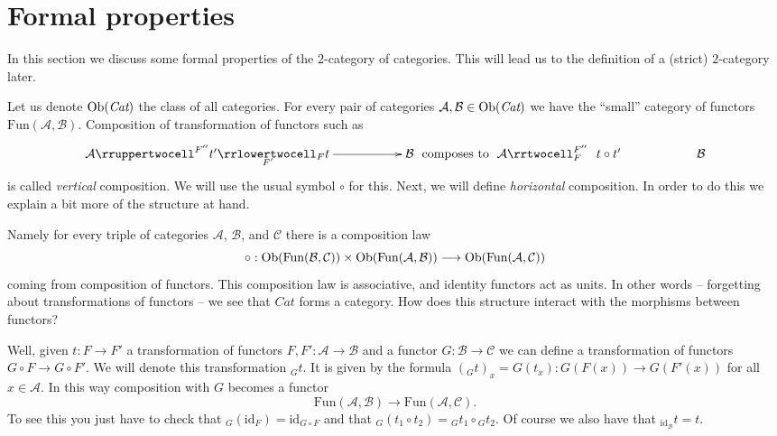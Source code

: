\section{Formal properties}
\label{section-formal-cat-cat}

\noindent
In this section we discuss some formal properties of the
$2$-category of categories. This will lead us to the definition
of a (strict) $2$-category later.

\medskip\noindent
Let us denote $\mathop{\mathrm{Ob}}\nolimits(\textit{Cat})$ the class of all categories.
For every pair of categories
$\mathcal{A}, \mathcal{B} \in \mathop{\mathrm{Ob}}\nolimits(\textit{Cat})$
we have the ``small'' category of functors
$\text{Fun}(\mathcal{A}, \mathcal{B})$.
Composition of transformation of functors such as
$$
\xymatrix{
\mathcal{A}
\rruppertwocell^{F''}{t'}
\ar[rr]_(.3){F'}
\rrlowertwocell_F{t}
& &
\mathcal{B}
}
\text{ composes to }
\xymatrix{
\mathcal{A}
\rrtwocell^{F''}_F{\ \ t \circ t'}
& &
\mathcal{B}
}
$$
is called {\it vertical} composition. We will use the usual
symbol $\circ$ for this. Next, we will define {\it horizontal}
composition. In order to do this we explain a bit more
of the structure at hand.

\medskip\noindent
Namely for every triple
of categories $\mathcal{A}$, $\mathcal{B}$, and $\mathcal{C}$
there is a composition law
$$
\circ : \mathop{\mathrm{Ob}}\nolimits(\text{Fun}(\mathcal{B}, \mathcal{C}))
\times
\mathop{\mathrm{Ob}}\nolimits(\text{Fun}(\mathcal{A}, \mathcal{B}))
\longrightarrow
\mathop{\mathrm{Ob}}\nolimits(\text{Fun}(\mathcal{A}, \mathcal{C}))
$$
coming from composition of functors. This composition law
is associative, and identity functors act as units. In other
words -- forgetting about transformations of functors --
we see that $\textit{Cat}$ forms a category. How does
this structure interact with the morphisms between functors?

\medskip\noindent
Well, given $t : F \to F'$ a transformation of
functors $F, F' : \mathcal{A} \to \mathcal{B}$ and
a functor
$G : \mathcal{B} \to \mathcal{C}$ we can define
a transformation of functors
$G\circ F \to G \circ F'$. We will denote this
transformation ${}_Gt$. It is given by the formula
$({}_Gt)_x = G(t_x) : G(F(x)) \to G(F'(x))$
for all $x \in \mathcal{A}$.
In this way composition
with $G$ becomes a functor
$$
\text{Fun}(\mathcal{A}, \mathcal{B})
\longrightarrow
\text{Fun}(\mathcal{A}, \mathcal{C}).
$$
To see this you just have to check that
${}_G(\text{id}_F) = \text{id}_{G \circ F}$ and that
${}_G(t_1 \circ t_2) = {}_Gt_1 \circ {}_Gt_2$.
Of course we also have that ${}_{\text{id}_\mathcal{B}}t = t$.


